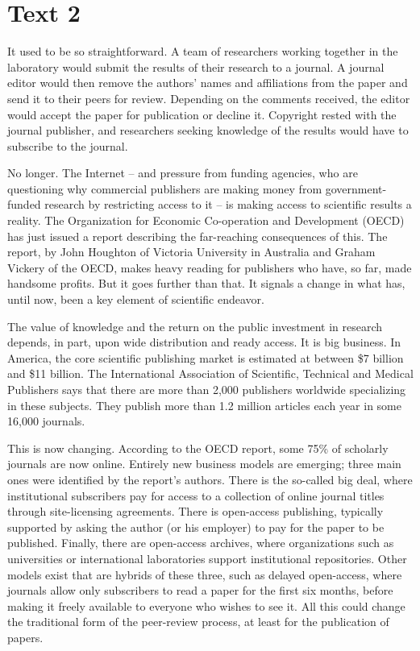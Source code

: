 \documentclass[a4paper]{ctexart}
\begin{document}
\section{Text 2}
It used to be so straightforward. A team of researchers working together in the laboratory would submit the results of their research to a journal. A journal editor would then remove the authors’ names and affiliations from the paper and send it to their peers for review. Depending on the comments received, the editor would accept the paper for publication or decline it. Copyright rested with the journal publisher, and researchers seeking knowledge of the results would have to subscribe to the journal.
\par
No longer. The Internet – and pressure from funding agencies, who are questioning why commercial publishers are making money from government-funded research by restricting access to it – is making access to scientific results a reality. The Organization for Economic Co-operation and Development (OECD) has just issued a report describing the far-reaching consequences of this. The report, by John Houghton of Victoria University in Australia and Graham Vickery of the OECD, makes heavy reading for publishers who have, so far, made handsome profits. But it goes further than that. It signals a change in what has, until now, been a key element of scientific endeavor.
\par
The value of knowledge and the return on the public investment in research depends, in part, upon wide distribution and ready access. It is big business. In America, the core scientific publishing market is estimated at between \$7 billion and \$11 billion. The International Association of Scientific, Technical and Medical Publishers says that there are more than 2,000 publishers worldwide specializing in these subjects. They publish more than 1.2 million articles each year in some 16,000 journals.
\par
This is now changing. According to the OECD report, some 75\% of scholarly journals are now online. Entirely new business models are emerging; three main ones were identified by the report’s authors. There is the so-called big deal, where institutional subscribers pay for access to a collection of online journal titles through site-licensing agreements. There is open-access publishing, typically supported by asking the author (or his employer) to pay for the paper to be published. Finally, there are open-access archives, where organizations such as universities or international laboratories support institutional repositories. Other models exist that are hybrids of these three, such as delayed open-access, where journals allow only subscribers to read a paper for the first six months, before making it freely available to everyone who wishes to see it. All this could change the traditional form of the peer-review process, at least for the publication of papers.
\end{document}
